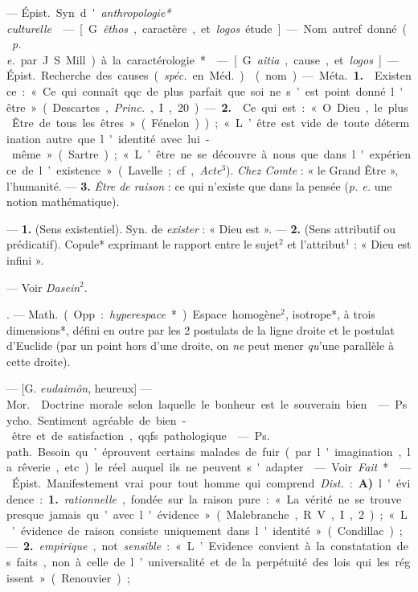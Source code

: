\begin{itemize}[leftmargin=1cm, label=, itemsep=1pt]
 — \si{Épist.} Syn. d'{\it anthropologie* culturelle}.

 — [G. {\it êthos}, caractère, et {\it logos}
étude] — Nom autref. donné ({\it p. e.}
par J. S. Mill) à la caractérologie*.

 — [G. {\it aitia}, cause, et {\it logos}] —
\si{Épist.} Recherche des causes ({\it spéc.}
en \si{Méd.}).

 (nom) — \si{Méta.} {\bf 1.}  Existence :
« Ce qui connaît qqc. de plus parfait
que soi ne s’est point donné l'être »
(Descartes, {\it Princ.}, I, 20). — {\bf 2.}  Ce
qui est : « O Dieu, le plus Être de
tous les êtres » (Fénelon)); « L’être
est vide de toute détermination
autre que l'identité avec lui-même »
(Sartre); « L’être ne se découvre à
nous que dans l'expérience de l’existence »
(Lavelle; cf, {\it Acte}$^3$). {\it Chez
Comte} : « le Grand Être », l'humanité.
— {\bf 3.} {\it Être de raison} : ce qui n'existe
que dans la pensée ({\it p. e.} une notion
mathématique).

 — {\bf 1.} (Sens existentiel).
Syn. de {\it exister} : « Dieu est ». — {\bf 2.}
(Sens attributif ou prédicatif). Copule* exprimant le rapport entre le
sujet$^2$ et l'attribut$^1$ : « Dieu est infini ».

 — Voir {\it Dasein}$^2$.

. — \si{Math.} (Opp. :
{\it hyperespace}*). Espace homogène$^2$,
isotrope*, à trois dimensions*, défini
en outre par les 2 postulats de la
ligne droite et le postulat d'Euclide
(par un point hors d’une droite, on
{\it ne} peut mener {\it qu}'une parallèle à
cette droite).

 — [G. {\it eudaimôn}, heureux] — \si{Mor.} 
Doctrine morale selon laquelle le bonheur est le souverain bien.

 — \si{Psycho.} Sentiment
agréable de bien-être et de satisfaction, qqfs. pathologique.

 — \si{Ps. path.} Besoin qu’éprouvent certains malades de
fuir (par l'imagination, la rêverie, etc.) le
réel auquel ils ne peuvent s'adapter.

 — Voir {\it Fait}*.

 — \si{Épist.} Manifestement vrai pour tout homme qui
comprend. {\it Dist.} : {\bf A)} l'évidence :
{\bf 1.} {\it rationnelle}, fondée sur la raison
pure : « La vérité ne se trouve
presque jamais qu'avec l'évidence »
(Malebranche, R. V., I, 2); « L'évidence de raison consiste uniquement dans
l'identité » (Condillac) ; — {\bf 2.} {\it empirique}, not. {\it sensible} :
 « L’Evidence convient à la constatation des
faits, non à celle de l’universalité
et de la perpétuité des lois qui les régissent » (Renouvier);


\end{itemize}
